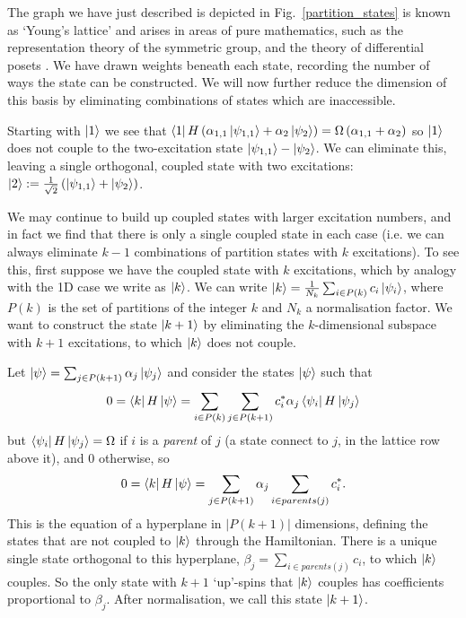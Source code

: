 The graph we have just described is depicted in Fig.~\ref{partition_states}  is known as `Young's lattice' and arises in areas of pure mathematics, such as the representation theory of the symmetric group, and the theory of differential posets \cite{Sagan:2001p6568}. We have drawn weights beneath each state, recording the number of ways the state can be constructed. We will now further reduce the dimension of this basis
by eliminating combinations of states which are inaccessible.

Starting with $\left\vert1\right\rangle$ we see that $\left\langle 1\right\vert H\left(\alpha_{1,1}\left\vert\psi_{1,1}\right\rangle+ \alpha_{2}\left\vert\psi_{2}\right\rangle\right) =\Omega\left(\alpha_{1,1}+ \alpha_{2}\right)$ so $\left\vert1\right\rangle$ does not couple to the two-excitation state $\left\vert\psi_{1,1}\right\rangle-\left\vert\psi_{2}\right\rangle$. We can eliminate this, leaving a single orthogonal, coupled state with two excitations: $\left\vert2\right\rangle := \frac{1}{\sqrt{2}}\left( \left\vert\psi_{1,1}\right\rangle+\left\vert\psi_2\right\rangle \right)$.

We may continue to build up coupled states with larger excitation numbers, and in fact we find that there is only a single coupled state in each case (i.e. we can always eliminate $k-1$ combinations of partition states with $k$ excitations).  To see this, first suppose we have the coupled state with $k$ excitations, which by analogy with the 1D case we write as $\left\vert k\right\rangle$. We can write $\left\vert k\right\rangle=\frac{1}{N_k}\sum_{i\in P(k)}c_{i}\left\vert\psi_{i}\right\rangle$, where $P(k)$ is the set of partitions of the integer $k$ and $N_k$ a normalisation factor. We want to construct the state $\left\vert k+1\right\rangle$ by eliminating the $k$-dimensional subspace with $k+1$ excitations, to which $\left\vert k\right\rangle$ does not couple.

Let $\left\vert\psi\right\rangle=\sum_{j\in P(k+1)}\alpha_{j}\left\vert\psi_{j}\right\rangle$ and consider the states $\left\vert\psi\right\rangle$ such that \[ 0=\left\langle k\right\vert H\left\vert\psi\right\rangle=\sum_{i\in P(k)}\sum_{j\in P(k+1)}c_{i}^{*}\alpha_{j}\left\langle \psi_{i}\right\vert H\left\vert\psi_{j}\right\rangle\] but $\left\langle \psi_{i}\right\vert H\left\vert\psi_{j}\right\rangle=\Omega$ if $i$ is a {\it parent} of $j$ (a state connect to $j$, in the lattice row above it), and $0$ otherwise, so \[0=\left\langle k\right\vert H\left\vert\psi\right\rangle=\sum_{j\in P(k+1)}\alpha_{j}\sum_{i\in parents(j)}c_{i}^{*}.\] This is the equation of a hyperplane in $|P(k+1)|$ dimensions, defining the states that are not coupled to $\left\vert k\right\rangle$ through the Hamiltonian.  There is a unique single state orthogonal to this hyperplane, $\beta_{j}=\sum_{i\in parents(j)}c_{i}$, to which $\left\vert k\right\rangle$ couples.  So the only state with $k+1$ `up'-spins that $\left\vert k\right\rangle$ couples has coefficients proportional to $\beta_{j}$. After normalisation, we call this state $\left\vert k+1\right\rangle$.

